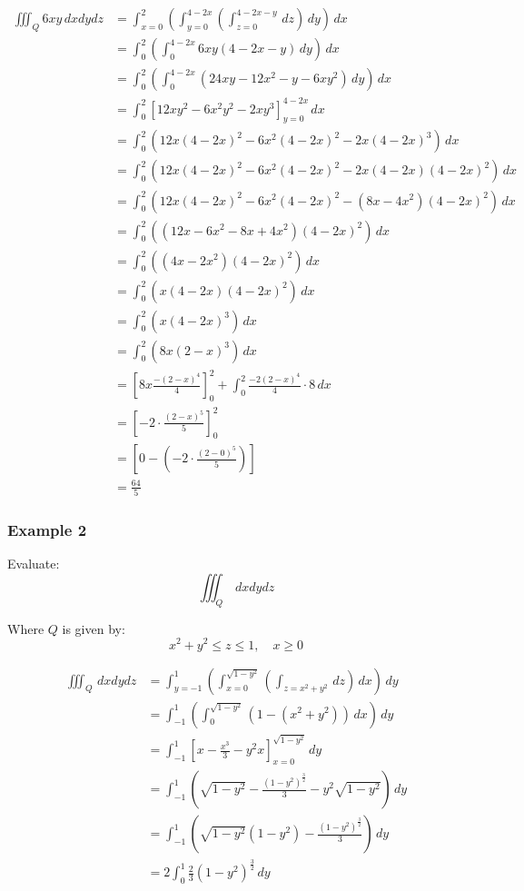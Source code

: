 \documentclass[11pt]{article}
\begin{document}
\begin{align*}
\iiint_Q 6xy \, dx dy dz &= \int_{x = 0}^2 \left( \int_{y = 0}^{4 - 2x} \left( \int_{z = 0}^{4 - 2x - y} \, dz \right) \, dy \right) \, dx \\
&= \int_0^2 \left( \int_0^{4 - 2x} 6xy(4 - 2x - y) \, dy \right) \, dx \\
&= \int_0^2 \left( \int_0^{4 - 2x} (24xy - 12x^2 - y - 6xy^2) \, dy \right) \, dx \\
&= \int_0^2 \left[12xy^2 - 6x^2y^2 - 2xy^3 \right]_{y = 0}^{4 - 2x} \, dx \\
&= \int_0^2 \left(12x(4 - 2x)^2 - 6x^2(4 - 2x)^2 - 2x(4 - 2x)^3 \right) \, dx \\
&= \int_0^2 \left(12x(4 - 2x)^2 - 6x^2(4 - 2x)^2 - 2x(4 - 2x)(4 - 2x)^2 \right) \, dx \\
&= \int_0^2 \left(12x(4 - 2x)^2 - 6x^2(4 - 2x)^2 - (8x - 4x^2)(4 - 2x)^2 \right) \, dx \\
&= \int_0^2 \left((12x - 6x^2 - 8x + 4x^2)(4 - 2x)^2 \right) \, dx \\
&= \int_0^2 \left((4x - 2x^2)(4 - 2x)^2 \right) \, dx \\
&= \int_0^2 \left(x(4 - 2x)(4 - 2x)^2 \right) \, dx \\
&= \int_0^2 \left(x(4 - 2x)^3 \right) \, dx \\
&= \int_0^2 \left(8x(2 - x)^3 \right) \, dx \\
&= \left[8x \frac{-(2 - x)^4}{4} \right]_0^2 + \int_0^2 \frac{-2(2 - x)^4}{4} \cdot 8 \, dx \\
&= \left[-2 \cdot \frac{(2 - x)^5}{5} \right]_0^2 \\
&= \left[0 - \left(- 2 \cdot \frac{(2 - 0)^5}{5} \right) \right] \\
&= \frac{64}{5}
\end{align*}
\subsubsection{Example 2}
\label{sec:orgb93da78}
Evaluate:
\[\iiint_Q \, dx dy dz\]

Where \(Q\) is given by:
\[x^2 + y^2 \le z \le 1, \quad x \ge 0\]

\begin{align*}
\iiint_Q \, dx dy dz &= \int_{y = -1}^1 \left( \int_{x = 0}^{\sqrt{1 - y^2}} \left( \int_{z = x^2 + y^2} \, dz \right) \, dx \right) \, dy \\
&= \int_{-1}^{1} \left( \int_{0}^{\sqrt{1 - y^2}} (1 - (x^2 + y^2)) \, dx \right) \, dy \\
&= \int_{-1}^1 \left[x - \frac{x^3}{3} - y^2 x \right]_{x = 0}^{\sqrt{1 - y^2}} \, dy \\
&= \int_{-1}^1 \left(\sqrt{1 - y^2} - \frac{(1 - y^2)^{\frac{3}{2}}}{3} - y^2 \sqrt{1 - y^2} \right) \, dy \\
&= \int_{-1}^1 \left( \sqrt{1 - y^2} (1- y^2) - \frac{(1- y^2)^{\frac{3}{2}}}{3} \right) \, dy \\
&= 2 \int_0^1 \frac{2}{3} (1 - y^2)^{\frac{3}{2}} \, dy
\end{align*}
\end{document}
